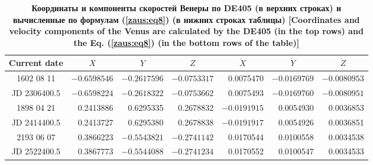 \begin{table}
\center \small
\begin{minipage}[t]{160mm}
\centering
\caption{\bf Координаты и компоненты скоростей Венеры по DE405 (в верхних строках) и вычисленные по формулам  (\ref{zaus:eq8}) (в нижних строках таблицы) [Coordinates and velocity components of the Venus are calculated by the  DE405 (in the top rows) and the Eq. (\ref{zaus:eq8}) (in the bottom rows of the table)]
\vspace{-3mm}}
\begin{tabular}{|c|r|r|r|r|r|r|}
\hline
\footnotesize
\rule{0mm}{12pt}%
Current date & \multicolumn{1}{c|}{\footnotesize $X$}&	\multicolumn{1}{c|}{\footnotesize $Y$}&	\multicolumn{1}{c|}{\footnotesize $Z$}&	\multicolumn{1}{c|}{\footnotesize $\dot{X}$}&	\multicolumn{1}{c|}{\footnotesize $\dot{Y}$}&	\multicolumn{1}{c|}{\footnotesize$\dot{Z}$}\\ \hline
\rule{0mm}{14pt}%
%
1602 08 11&	$-0.6598546$&	$-0.2617596$&	$-0.0753317$&	0.0075470&	$-0.0169769$&	  $-0.0080953$\\
JD 2306400.5&	$-0.6598224$&	$-0.2618322$&	$-0.0753662$&	0.0075493&	$-0.0169760$&	  $-0.0080951$\\ \hline
1898 04 21&	0.2413886&	0.6295335&	0.2678832&	$-0.0191915$ &	0.0054930&	  0.0036853\\
JD 2414400.5&	0.2413727&	0.6295380&	0.2678838&	$-0.0191917$ &	0.0054926&	  0.0036851\\ \hline
2193 06 07&	0.3866223&	$-0.5543821$&	$-0.2741142$&	 0.0170544&	0.0100558&	  0.0034538 \\
JD 2522400.5&	0.3867773&	$-0.5544088$&	$-0.2741234$&	 0.0170552&	0.0100547&	  0.0034533\\ \hline
\end{tabular}
\label{table:zausaev:tabl4}


\vspace{5mm}


\end{minipage}
\end{table}
